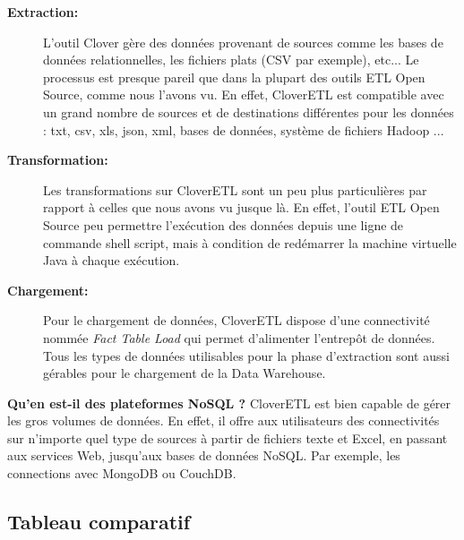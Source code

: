 \documentclass[12pt,a4wide,twoside]{report}
\begin{document}
\begin{description}
	\item[\textbf{Extraction:}]
	L'outil Clover gère des données provenant de sources comme les bases de données relationnelles, les fichiers plats (CSV par exemple), etc...\newline
	Le processus est presque pareil que dans la plupart des outils ETL Open Source, comme nous l'avons vu.\newline
	En effet, CloverETL est compatible avec un grand nombre de sources et de destinations différentes pour les données : txt, csv, xls, json, xml, bases de données, système de fichiers Hadoop ...

	\item[\textbf{Transformation:}]
	Les transformations sur CloverETL sont un peu plus particulières par rapport à celles que nous avons vu jusque là. En effet, l'outil ETL Open Source peu permettre l'exécution des données depuis une ligne de commande shell script, mais à condition de redémarrer la machine virtuelle Java à chaque exécution.

	\item[\textbf{Chargement:}]   
	Pour le chargement de données, CloverETL dispose d'une connectivité nommée \emph{Fact Table Load} qui permet d'alimenter l'entrepôt de données. Tous les types de données utilisables pour la phase d'extraction sont aussi gérables pour le chargement de la Data Warehouse.
	
\end{description}
\textbf{Qu'en est-il des plateformes NoSQL ?} \newline
CloverETL est bien capable de gérer les gros volumes de données. En effet, il offre aux utilisateurs des connectivités sur n'importe quel type de sources à partir de fichiers texte et Excel, en passant aux services Web, jusqu'aux bases de données NoSQL. Par exemple, les connections avec MongoDB ou CouchDB. 
				
				\subsection{Tableau comparatif}
				
\end{document}

